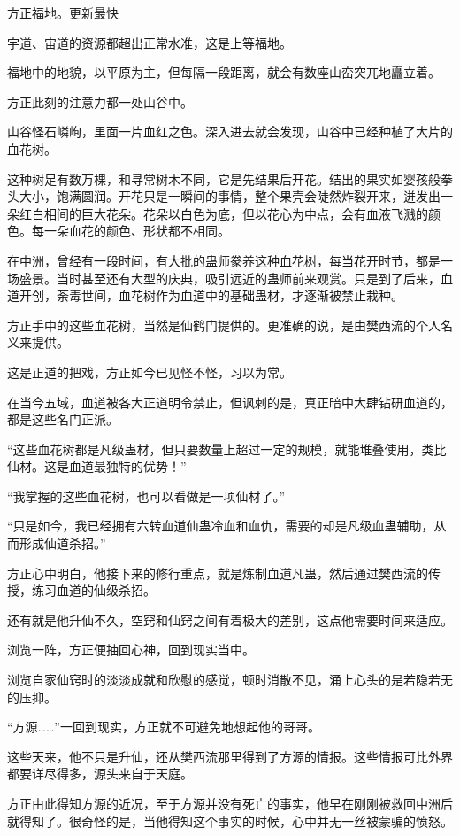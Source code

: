 
\begin{this_body}

方正福地。更新最快

宇道、宙道的资源都超出正常水准，这是上等福地。

福地中的地貌，以平原为主，但每隔一段距离，就会有数座山峦突兀地矗立着。

方正此刻的注意力都一处山谷中。

山谷怪石嶙峋，里面一片血红之色。深入进去就会发现，山谷中已经种植了大片的血花树。

这种树足有数万棵，和寻常树木不同，它是先结果后开花。结出的果实如婴孩般拳头大小，饱满圆润。开花只是一瞬间的事情，整个果壳会陡然炸裂开来，迸发出一朵红白相间的巨大花朵。花朵以白色为底，但以花心为中点，会有血液飞溅的颜色。每一朵血花的颜色、形状都不相同。

在中洲，曾经有一段时间，有大批的蛊师豢养这种血花树，每当花开时节，都是一场盛景。当时甚至还有大型的庆典，吸引远近的蛊师前来观赏。只是到了后来，血道开创，荼毒世间，血花树作为血道中的基础蛊材，才逐渐被禁止栽种。

方正手中的这些血花树，当然是仙鹤门提供的。更准确的说，是由樊西流的个人名义来提供。

这是正道的把戏，方正如今已见怪不怪，习以为常。

在当今五域，血道被各大正道明令禁止，但讽刺的是，真正暗中大肆钻研血道的，都是这些名门正派。

“这些血花树都是凡级蛊材，但只要数量上超过一定的规模，就能堆叠使用，类比仙材。这是血道最独特的优势！”

“我掌握的这些血花树，也可以看做是一项仙材了。”

“只是如今，我已经拥有六转血道仙蛊冷血和血仇，需要的却是凡级血蛊辅助，从而形成仙道杀招。”

方正心中明白，他接下来的修行重点，就是炼制血道凡蛊，然后通过樊西流的传授，练习血道的仙级杀招。

还有就是他升仙不久，空窍和仙窍之间有着极大的差别，这点他需要时间来适应。

浏览一阵，方正便抽回心神，回到现实当中。

浏览自家仙窍时的淡淡成就和欣慰的感觉，顿时消散不见，涌上心头的是若隐若无的压抑。

“方源……”一回到现实，方正就不可避免地想起他的哥哥。

这些天来，他不只是升仙，还从樊西流那里得到了方源的情报。这些情报可比外界都要详尽得多，源头来自于天庭。

方正由此得知方源的近况，至于方源并没有死亡的事实，他早在刚刚被救回中洲后就得知了。很奇怪的是，当他得知这个事实的时候，心中并无一丝被蒙骗的愤怒。


\end{this_body}
